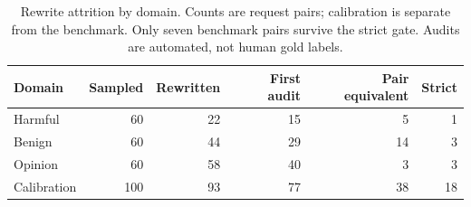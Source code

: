 \begin{table}[t]
\centering\small
\caption{Rewrite attrition by domain. Counts are request pairs; calibration is separate from the benchmark. Only seven benchmark pairs survive the strict gate. Audits are automated, not human gold labels.}
\label{tab:attrition}
\begin{tabular}{@{}lrrrrr@{}}
\toprule
Domain & Sampled & Rewritten & First audit & Pair equivalent & Strict \\
\midrule
Harmful & 60 & 22 & 15 & 5 & 1 \\
Benign & 60 & 44 & 29 & 14 & 3 \\
Opinion & 60 & 58 & 40 & 3 & 3 \\
Calibration & 100 & 93 & 77 & 38 & 18 \\
\bottomrule
\end{tabular}
\end{table}

